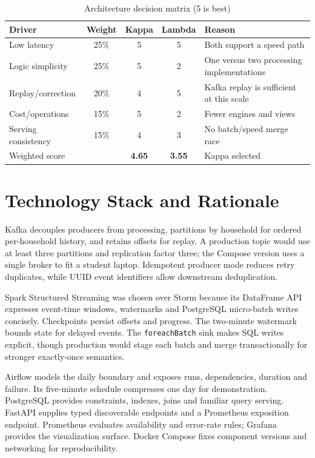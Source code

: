 \documentclass[11pt,a4paper]{article}
\newcommand{\code}[1]{\texttt{#1}}
\begin{document}
\begin{table}[H]\centering\small
\caption{Architecture decision matrix (5 is best)}
\begin{tabular}{lcccl}\toprule Driver & Weight & Kappa & Lambda & Reason \\\midrule
Low latency & 25\% & 5 & 5 & Both support a speed path\\
Logic simplicity & 25\% & 5 & 2 & One versus two processing implementations\\
Replay/correction & 20\% & 4 & 5 & Kafka replay is sufficient at this scale\\
Cost/operations & 15\% & 5 & 2 & Fewer engines and views\\
Serving consistency & 15\% & 4 & 3 & No batch/speed merge race\\\midrule
Weighted score & & \textbf{4.65} & \textbf{3.55} & Kappa selected\\\bottomrule
\end{tabular}\end{table}

\section{Technology Stack and Rationale}
Kafka decouples producers from processing, partitions by household for ordered per-household history, and retains offsets for replay. A production topic would use at least three partitions and replication factor three; the Compose version uses a single broker to fit a student laptop. Idempotent producer mode reduces retry duplicates, while UUID event identifiers allow downstream deduplication.

Spark Structured Streaming was chosen over Storm because its DataFrame API expresses event-time windows, watermarks and PostgreSQL micro-batch writes concisely. Checkpoints persist offsets and progress. The two-minute watermark bounds state for delayed events. The \code{foreachBatch} sink makes SQL writes explicit, though production would stage each batch and merge transactionally for stronger exactly-once semantics.

Airflow models the daily boundary and exposes runs, dependencies, duration and failure. Its five-minute schedule compresses one day for demonstration. PostgreSQL provides constraints, indexes, joins and familiar query serving. FastAPI supplies typed discoverable endpoints and a Prometheus exposition endpoint. Prometheus evaluates availability and error-rate rules; Grafana provides the visualization surface. Docker Compose fixes component versions and networking for reproducibility.
\end{document}

